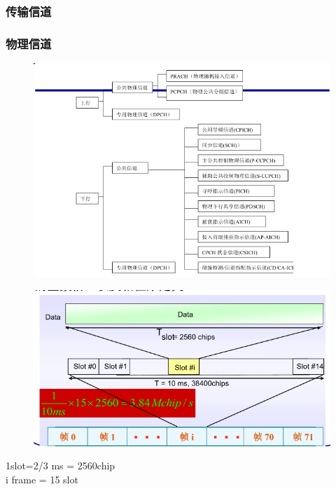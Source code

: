 \subsubsection{传输信道}	
\subsubsection{物理信道}
\begin{figure}[H]
	\centering
	\includegraphics[width=0.7\linewidth]{figures/screenshot0021}
	\caption{}
	\label{fig:screenshot0021}
\end{figure}
\begin{figure}[H]
	\centering
	\includegraphics[width=0.7\linewidth]{figures/screenshot0022}
	\caption{}
	\label{fig:screenshot0022}
\end{figure}
1slot=2/3 ms = 2560chip\\
i frame = 15 slot